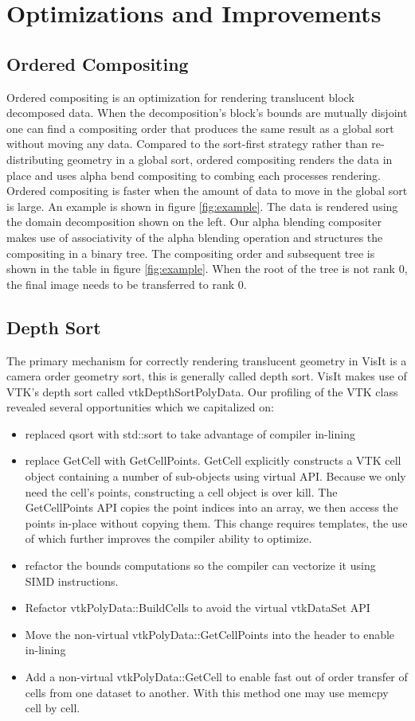 \documentclass[a4paper,10pt]{report}
\begin{document}
\section{Optimizations and Improvements}
\subsection*{Ordered Compositing}
Ordered compositing is an optimization for rendering translucent block decomposed data. When the decomposition's block's bounds are mutually disjoint one can find a compositing order that produces the same result as a global sort without moving any data. Compared to the sort-first strategy rather than re-distributing geometry in a global sort, ordered compositing renders the data in place and uses alpha bend compositing to combing each processes rendering. Ordered compositing is faster when the amount of data to move in the global sort is large. An example is shown in figure \ref{fig:example}. The data is rendered using the domain decomposition shown on the left. Our alpha blending compositer makes use of associativity of the alpha blending operation and structures the compositing in a binary tree. The compositing order and subsequent tree is shown in the table in figure \ref{fig:example}. When the root of the tree is not rank 0, the final image needs to be transferred to rank 0.

\subsection*{Depth Sort}
The primary mechanism for correctly rendering translucent geometry in VisIt is a camera order geometry sort, this is generally called depth sort. VisIt makes use of VTK's depth sort called vtkDepthSortPolyData. Our profiling of the VTK class revealed several opportunities which we capitalized on:
\begin{itemize}
 \item replaced qsort with std::sort to take advantage of compiler in-lining
 \item replace GetCell with GetCellPoints. GetCell explicitly constructs a VTK cell object containing a number of sub-objects using virtual API. Because we only need the cell's points, constructing a cell object is over kill. The GetCellPoints API copies the point indices into an array, we then access the points in-place without copying them. This change requires templates, the use of which further improves the compiler ability to optimize.
 \item refactor the bounds computations so the compiler can vectorize it using SIMD instructions.
 \item Refactor vtkPolyData::BuildCells to avoid the virtual vtkDataSet API
 \item Move the non-virtual vtkPolyData::GetCellPoints into the header to enable in-lining
 \item Add a non-virtual vtkPolyData::GetCell to enable fast out of order transfer of cells from one dataset to another. With this method one may use memcpy cell by cell.
\end{itemize}
\end{document}
